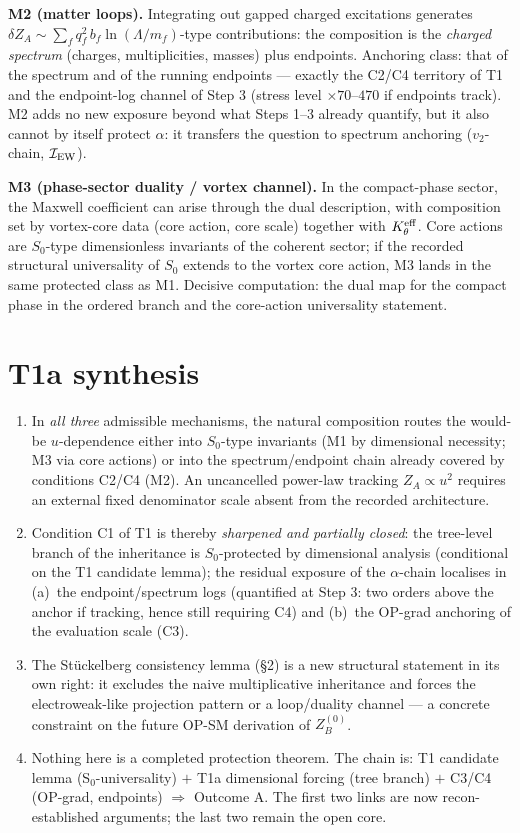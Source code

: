 \documentclass[11pt,a4paper]{article}
\begin{document}
\textbf{M2 (matter loops).} Integrating out gapped charged excitations generates
$\delta Z_A\sim\sum_f q_f^2\,b_f\ln(\Lambda/m_f)$-type contributions: the
composition is the \emph{charged spectrum} (charges, multiplicities, masses) plus
endpoints. Anchoring class: that of the spectrum and of the running endpoints ---
exactly the C2/C4 territory of T1 and the endpoint-log channel of Step 3
(stress level $\times70$--$470$ if endpoints track). M2 adds no new exposure
beyond what Steps 1--3 already quantify, but it also cannot by itself protect
$\alpha$: it transfers the question to spectrum anchoring ($v_2$-chain,
$\mathcal I_{\rm EW}$).

\textbf{M3 (phase-sector duality / vortex channel).} In the compact-phase sector,
the Maxwell coefficient can arise through the dual description, with composition
set by vortex-core data (core action, core scale) together with
$K_\theta^{\rm eff}$. Core actions are $S_0$-type dimensionless invariants of the
coherent sector; if the recorded structural universality of $S_0$ extends to the
vortex core action, M3 lands in the same protected class as M1. Decisive
computation: the dual map for the compact phase in the ordered branch and the
core-action universality statement.

\section{T1a synthesis}
\begin{enumerate}[leftmargin=1.9em,itemsep=2pt,label=\textbf{S\arabic*.}]
\item In \emph{all three} admissible mechanisms, the natural composition routes
the would-be $u$-dependence either into $S_0$-type invariants (M1 by dimensional
necessity; M3 via core actions) or into the spectrum/endpoint chain already
covered by conditions C2/C4 (M2). An uncancelled power-law tracking
$Z_A\propto u^2$ requires an external fixed denominator scale absent from the
recorded architecture.
\item Condition C1 of T1 is thereby \emph{sharpened and partially closed}: the
tree-level branch of the inheritance is $S_0$-protected by dimensional analysis
(conditional on the T1 candidate lemma); the residual exposure of the
$\alpha$-chain localises in (a)~the endpoint/spectrum logs (quantified at Step 3:
two orders above the anchor if tracking, hence still requiring C4) and (b)~the
OP-grad anchoring of the evaluation scale (C3).
\item The St\"uckelberg consistency lemma (\S2) is a new structural statement in
its own right: it excludes the naive multiplicative inheritance and forces the
electroweak-like projection pattern or a loop/duality channel --- a concrete
constraint on the future OP-SM derivation of $Z_B^{(0)}$.
\item Nothing here is a completed protection theorem. The chain is: T1 candidate
lemma (S$_0$-universality) $+$ T1a dimensional forcing (tree branch) $+$ C3/C4
(OP-grad, endpoints) $\Rightarrow$ Outcome A. The first two links are now
recon-established arguments; the last two remain the open core.
\end{enumerate}
\end{document}

